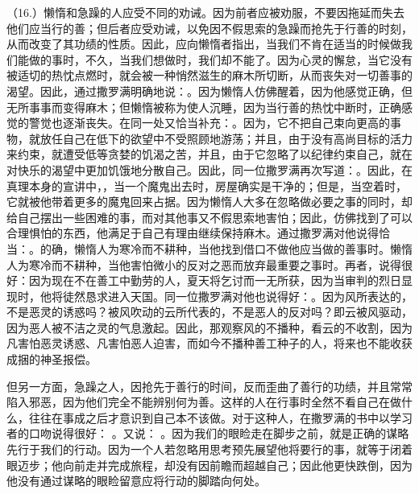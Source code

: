 （16.）懒惰和急躁的人应受不同的劝诫。因为前者应被劝服，不要因拖延而失去他们应当行的善；但后者应受劝诫，以免因不假思索的急躁而抢先于行善的时刻，从而改变了其功绩的性质。因此，应向懒惰者指出，当我们不肯在适当的时候做我们能做的事时，不久，当我们想做时，我们却不能了。因为心灵的懈怠，当它没有被适切的热忱点燃时，就会被一种悄然滋生的麻木所切断，从而丧失对一切善事的渴望。因此，通过撒罗满明确地说：。因为懒惰人仿佛醒着，因为他感觉正确，但无所事事而变得麻木；但懒惰被称为使人沉睡，因为当行善的热忱中断时，正确感觉的警觉也逐渐丧失。在同一处又恰当补充：。因为，它不把自己束向更高的事物，就放任自己在低下的欲望中不受照顾地游荡；并且，由于没有高尚目标的活力来约束，就遭受低等贪婪的饥渴之苦，并且，由于它忽略了以纪律约束自己，就在对快乐的渴望中更加饥饿地分散自己。因此，同一位撒罗满再次写道：。因此，在真理本身的宣讲中，，当一个魔鬼出去时，房屋确实是干净的；但是，当空着时，它就被他带着更多的魔鬼回来占据。因为懒惰人大多在忽略做必要之事的同时，却给自己摆出一些困难的事，而对其他事又不假思索地害怕；因此，仿佛找到了可以合理惧怕的东西，他满足于自己有理由继续保持麻木。通过撒罗满对他说得恰当：。的确，懒惰人为寒冷而不耕种，当他找到借口不做他应当做的善事时。懒惰人为寒冷而不耕种，当他害怕微小的反对之恶而放弃最重要之事时。再者，说得很好：因为现在不在善工中勤劳的人，夏天将乞讨而一无所获，因为当审判的烈日显现时，他将徒然恳求进入天国。同一位撒罗满对他也说得好：。因为风所表达的，不是恶灵的诱惑吗？被风吹动的云所代表的，不是恶人的反对吗？即云被风驱动，因为恶人被不洁之灵的气息激起。因此，那观察风的不播种，看云的不收割，因为凡害怕恶灵诱惑、凡害怕恶人迫害，而如今不播种善工种子的人，将来也不能收获成捆的神圣报偿。\par

但另一方面，急躁之人，因抢先于善行的时间，反而歪曲了善行的功绩，并且常常陷入邪恶，因为他们完全不能辨别何为善。这样的人在行事时全然不看自己在做什么，往往在事成之后才意识到自己本不该做。对于这种人，在撒罗满的书中以学习者的口吻说得很好： 。又说： 。因为我们的眼睑走在脚步之前，就是正确的谋略先行于我们的行动。因为一个人若忽略用思考预先展望他将要行的事，就等于闭着眼迈步；他向前走并完成旅程，却没有因前瞻而超越自己；因此他更快跌倒，因为他没有通过谋略的眼睑留意应将行动的脚踏向何处。\par

